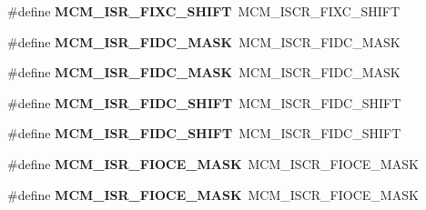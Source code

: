 \begin{DoxyCompactItemize}
\item 
\#define {\bfseries M\+C\+M\+\_\+\+I\+S\+R\+\_\+\+F\+I\+X\+C\+\_\+\+S\+H\+I\+FT}~M\+C\+M\+\_\+\+I\+S\+C\+R\+\_\+\+F\+I\+X\+C\+\_\+\+S\+H\+I\+FT\hypertarget{group__Backward__Compatibility__Symbols_ga2655b9e638b37e397318822fad7cf222}{}\label{group__Backward__Compatibility__Symbols_ga2655b9e638b37e397318822fad7cf222}

\item 
\#define {\bfseries M\+C\+M\+\_\+\+I\+S\+R\+\_\+\+F\+I\+D\+C\+\_\+\+M\+A\+SK}~M\+C\+M\+\_\+\+I\+S\+C\+R\+\_\+\+F\+I\+D\+C\+\_\+\+M\+A\+SK\hypertarget{group__Backward__Compatibility__Symbols_gae47ebe0808b7997f475825af2dfe3636}{}\label{group__Backward__Compatibility__Symbols_gae47ebe0808b7997f475825af2dfe3636}

\item 
\#define {\bfseries M\+C\+M\+\_\+\+I\+S\+R\+\_\+\+F\+I\+D\+C\+\_\+\+M\+A\+SK}~M\+C\+M\+\_\+\+I\+S\+C\+R\+\_\+\+F\+I\+D\+C\+\_\+\+M\+A\+SK\hypertarget{group__Backward__Compatibility__Symbols_gae47ebe0808b7997f475825af2dfe3636}{}\label{group__Backward__Compatibility__Symbols_gae47ebe0808b7997f475825af2dfe3636}

\item 
\#define {\bfseries M\+C\+M\+\_\+\+I\+S\+R\+\_\+\+F\+I\+D\+C\+\_\+\+S\+H\+I\+FT}~M\+C\+M\+\_\+\+I\+S\+C\+R\+\_\+\+F\+I\+D\+C\+\_\+\+S\+H\+I\+FT\hypertarget{group__Backward__Compatibility__Symbols_ga950f918e04715fa01ac699606ae0e803}{}\label{group__Backward__Compatibility__Symbols_ga950f918e04715fa01ac699606ae0e803}

\item 
\#define {\bfseries M\+C\+M\+\_\+\+I\+S\+R\+\_\+\+F\+I\+D\+C\+\_\+\+S\+H\+I\+FT}~M\+C\+M\+\_\+\+I\+S\+C\+R\+\_\+\+F\+I\+D\+C\+\_\+\+S\+H\+I\+FT\hypertarget{group__Backward__Compatibility__Symbols_ga950f918e04715fa01ac699606ae0e803}{}\label{group__Backward__Compatibility__Symbols_ga950f918e04715fa01ac699606ae0e803}

\item 
\#define {\bfseries M\+C\+M\+\_\+\+I\+S\+R\+\_\+\+F\+I\+O\+C\+E\+\_\+\+M\+A\+SK}~M\+C\+M\+\_\+\+I\+S\+C\+R\+\_\+\+F\+I\+O\+C\+E\+\_\+\+M\+A\+SK\hypertarget{group__Backward__Compatibility__Symbols_ga8c2d933b91a6be29be3c45a9120d1a6d}{}\label{group__Backward__Compatibility__Symbols_ga8c2d933b91a6be29be3c45a9120d1a6d}

\item 
\#define {\bfseries M\+C\+M\+\_\+\+I\+S\+R\+\_\+\+F\+I\+O\+C\+E\+\_\+\+M\+A\+SK}~M\+C\+M\+\_\+\+I\+S\+C\+R\+\_\+\+F\+I\+O\+C\+E\+\_\+\+M\+A\+SK\hypertarget{group__Backward__Compatibility__Symbols_ga8c2d933b91a6be29be3c45a9120d1a6d}{}\label{group__Backward__Compatibility__Symbols_ga8c2d933b91a6be29be3c45a9120d1a6d}


\end{DoxyCompactItemize}
